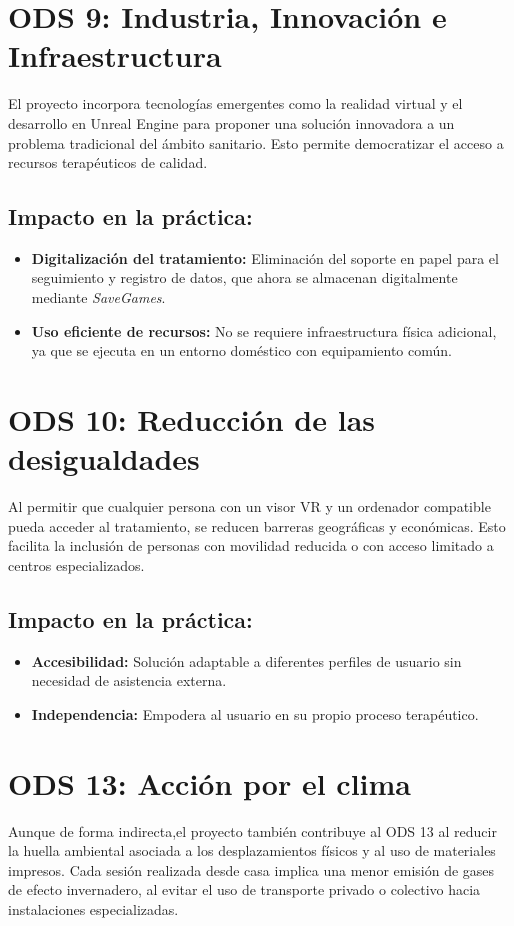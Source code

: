 \section{ODS 9: Industria, Innovación e Infraestructura}
El proyecto incorpora tecnologías emergentes como la realidad virtual y el desarrollo en Unreal Engine para proponer una solución innovadora a un problema tradicional del ámbito sanitario. Esto permite democratizar el acceso a recursos terapéuticos de calidad.

\subsection*{Impacto en la práctica:}
\begin{itemize}
  \item \textbf{Digitalización del tratamiento:} Eliminación del soporte en papel para el seguimiento y registro de datos, que ahora se almacenan digitalmente mediante \textit{SaveGames}.
  \item \textbf{Uso eficiente de recursos:} No se requiere infraestructura física adicional, ya que se ejecuta en un entorno doméstico con equipamiento común.
\end{itemize}

\section{ODS 10: Reducción de las desigualdades}
Al permitir que cualquier persona con un visor VR y un ordenador compatible pueda acceder al tratamiento, se reducen barreras geográficas y económicas. Esto facilita la inclusión de personas con movilidad reducida o con acceso limitado a centros especializados.

\subsection*{Impacto en la práctica:}
\begin{itemize}
  \item \textbf{Accesibilidad:} Solución adaptable a diferentes perfiles de usuario sin necesidad de asistencia externa.
  \item \textbf{Independencia:} Empodera al usuario en su propio proceso terapéutico.
\end{itemize}

\section{ODS 13: Acción por el clima}
Aunque de forma indirecta,el proyecto también contribuye al ODS 13 al reducir la huella ambiental asociada a los desplazamientos físicos y al uso de materiales impresos. Cada sesión realizada desde casa implica una menor emisión de gases de efecto invernadero, al evitar el uso de transporte privado o colectivo hacia instalaciones especializadas.

